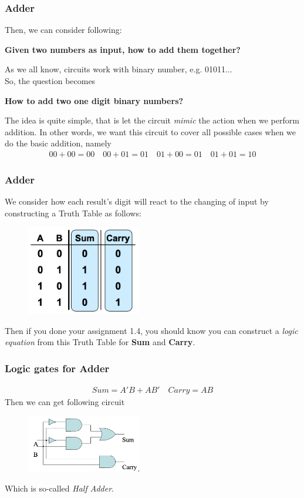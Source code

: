 \documentclass[12pt, t]{beamer}
\renewcommand{\emph}[1]{{\color{Turquoise3}\textsl{#1}}}
\begin{document}
\begin{frame}
    \frametitle{Adder}
Then, we can consider following:\\
\begin{center}
    \textbf{Given two numbers as input, how to add them together?}\\
\end{center}

As we all know, circuits work with binary number, e.g. 01011...\\
So, the question becomes
\begin{center}
    \textbf{How to add two one digit binary numbers?}\\
\end{center}

The idea is quite simple, that is let the circuit \emph{mimic} the action when we perform addition.
In other words, we want this circuit to cover all possible cases when we do the basic addition, namely\\
\begin{align*}
   00+00=00 \quad 00+01=01 \quad 01+00=01 \quad 01+01=10 
\end{align*}
\end{frame}    

\begin{frame}
    \frametitle{Adder}
We consider how each result's digit will react to the changing of input by constructing a Truth Table as follows:
\begin{figure}
    \centering
    \includegraphics[width=5cm]{Figures/Adder_T.png}
\end{figure}
Then if you done your assignment 1.4, you should know you can construct a \emph{logic equation} from this Truth Table for \textbf{Sum} and \textbf{Carry}.\\
\end{frame}   


\begin{frame}
    \frametitle{Logic gates for Adder}    
\begin{align*}
    Sum=A'B+AB' \quad Carry=AB
\end{align*}
Then we can get following circuit
\begin{figure}
    \centering
    \includegraphics[width=5cm]{Figures/HalfAdder.png}
\end{figure}
Which is so-called \emph{Half Adder}.
\end{frame}
\end{document}
